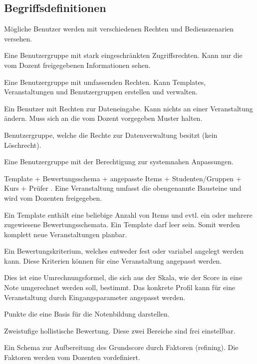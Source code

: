  \begin{appendix}
  \section{Begriffsdefinitionen}
	\begin{description}
	\item[Benutzergruppen] Mögliche Benutzer werden mit verschiedenen Rechten und Bedienszenarien versehen.
	\item[Student] Eine Benutzergruppe mit stark eingeschränkten Zugriffsrechten. Kann nur die vom Dozent freigegebenen Informationen sehen.
	\item[Dozent] Eine Benutzergruppe mit umfassenden Rechten. Kann Templates, Veranstaltungen und Benutzergruppen erstellen und verwalten.
	\item[Prüfer] Ein Benutzer mit Rechten zur Dateneingabe. Kann nichts an einer Veranstaltung ändern. Muss sich an die vom Dozent vorgegeben Muster halten.
	\item[Sekretariat] Benutzergruppe, welche die Rechte zur Datenverwaltung besitzt (kein Löschrecht).
	\item[Administrator] Eine Benutzergruppe mit der Berechtigung zur systemnahen Anpassungen.
	\item[Veranstaltung] Template + Bewertungsschema + angepasste Items + Studenten/Gruppen + Kurs + Prüfer . Eine Veranstaltung umfasst die obengenannte Bausteine und wird vom Dozenten freigegeben. 
	\item[Template] Ein Template enthält eine beliebige Anzahl von Items und evtl. ein oder mehrere zugewiesene Bewertungsschemata. Ein Template darf leer sein. Somit werden komplett neue Veranstaltungen planbar.
	\item[Item] Ein Bewertungskriterium, welches entweder fest oder variabel angelegt werden kann. Diese Kriterien können für eine Veranstaltung angepasst werden.
	\item[{\parbox[t]{0.2\linewidth}{Notenkonvertierungsprofil \\ (S$_2$G)}}] {\parbox[t]{\linewidth}{ Dies ist eine Umrechnungsformel, die sich aus der Skala, wie der Score in eine Note umgerechnet werden soll, bestimmt. Das konkrete Profil kann für eine Veranstaltung durch Eingangsparameter angepasst werden.}}
	\item[Score] Punkte die eine Basis für die Notenbildung darstellen.
	\item[Grundscore (H$_2$)]  Zweistufige hollistische Bewertung. Diese zwei Bereiche sind frei einstellbar.
	\item[Score Refining (S$_2$R)]  Ein Schema zur Aufbereitung des Grundscore durch Faktoren (refining). Die Faktoren werden vom Dozenten vordefiniert.
	

\end{description}
\end{appendix}
